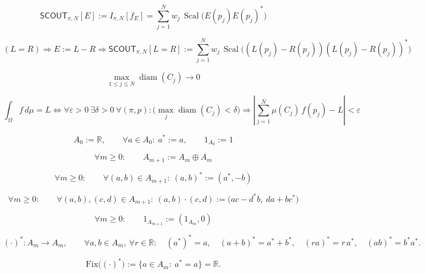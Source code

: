 \documentclass[12pt]{article}
\begin{document}
\begin{equation}
\mathsf{SCOUT}_{\pi,N}[E]
:=
I_{\pi,N}[f_E]
=
\sum_{j=1}^{N} w_j\,\operatorname{Scal}\!\big(E(p_j)E(p_j)^{*}\big)
\end{equation}

\begin{equation}
(L=R)
\Longrightarrow
E:=L-R
\Longrightarrow
\mathsf{SCOUT}_{\pi,N}[L=R]
:=
\sum_{j=1}^{N} w_j\,\operatorname{Scal}\!\big((L(p_j)-R(p_j))(L(p_j)-R(p_j))^{*}\big)
\end{equation}

\begin{equation}
\max_{1\le j\le N}\operatorname{diam}(C_j)\to 0
\end{equation}

\begin{equation}
\int_{\Omega} f\,d\mu = L
\Longleftrightarrow
\forall\varepsilon>0\ \exists\delta>0\ \forall(\pi,p):
\Big(\max_j\operatorname{diam}(C_j)<\delta\Big)
\Longrightarrow
\left|
\sum_{j=1}^{N}\mu(C_j)\,f(p_j)-L
\right|<\varepsilon
\end{equation}

\begin{equation}
A_0:=\mathbb{R},\qquad
\forall a\in A_0:\ a^{*}:=a,\qquad
1_{A_0}:=1
\end{equation}

\begin{equation}
\forall m\ge 0:\qquad
A_{m+1}:=A_m\oplus A_m
\end{equation}

\begin{equation}
\forall m\ge 0:\qquad
\forall(a,b)\in A_{m+1}:\ (a,b)^{*}:=(a^{*},-b)
\end{equation}

\begin{equation}
\forall m\ge 0:\qquad
\forall(a,b),(c,d)\in A_{m+1}:\ 
(a,b)\cdot(c,d):=\bigl(ac-d^{*}b,\ da+bc^{*}\bigr)
\end{equation}

\begin{equation}
\forall m\ge 0:\qquad
1_{A_{m+1}}:=(1_{A_m},0)
\end{equation}

\begin{equation}
(\cdot)^{*}:A_m\to A_m,\qquad
\forall a,b\in A_m,\ \forall r\in\mathbb{R}:\quad
(a^{*})^{*}=a,\quad
(a+b)^{*}=a^{*}+b^{*},\quad
(ra)^{*}=r\,a^{*},\quad
(ab)^{*}=b^{*}a^{*}.
\end{equation}

\begin{equation}
\mathrm{Fix}\big((\cdot)^{*}\big)
:=\{a\in A_m:\ a^{*}=a\}
=\mathbb{R}.
\end{equation}
\end{document}
